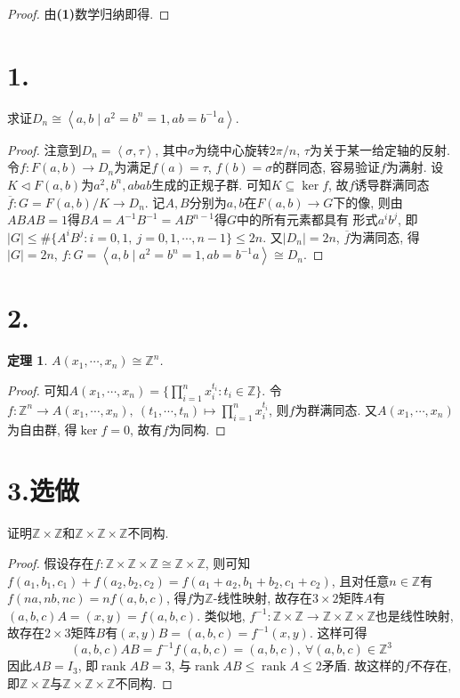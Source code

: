 \documentclass[12pt, a4paper, fontset=windows]{ctexart}
\newcommand{\Z}{\mathbb{Z}}
\newcommand{\abs}[1]{\left|{#1}\right|}
\newcommand{\cl}[1]{\overline{#1}} %
\newcommand{\gen}[1]{\left\langle{#1}\right\rangle}
\newcommand{\isom}{\cong} %
\newcommand{\rank}{\operatorname{rank}}
\newcommand{\xuan}{{\normalsize 选做}}
\newtheorem*{theorem}{定理}
\begin{document}
\begin{proof}
由{\bf (1)}数学归纳即得. 
\end{proof}

\section*{1.}

求证$D_n\isom\gen{a,b\mid a^2=b^n=1,ab=b^{-1}a}$. 

\begin{proof}
注意到$D_n=\gen{\sigma,\tau}$, 其中$\sigma$为绕中心旋转$2\pi/n$, 
$\tau$为关于某一给定轴的反射. 令$f:F(a,b)\to D_n$为满足$f(a)=\tau$, $f(b)=\sigma$的群同态, 
容易验证$f$为满射. 设$K\lhd F(a,b)$为$a^2,b^n,abab$生成的正规子群. 
可知$K\subseteq\ker f$, 故$f$诱导群满同态$\cl{f}:G=F(a,b)/K\to D_n$. 
记$A,B$分别为$a,b$在$F(a,b)\to G$下的像, 
则由$ABAB=1$得$BA=A^{-1}B^{-1}=AB^{n-1}$得$G$中的所有元素都具有
形式$a^ib^j$, 即$\abs{G}\le\#\{A^iB^j:i=0,1,\ j=0,1,\cdots,n-1\}\le 2n$. 
又$\abs{D_n}=2n$, $\cl{f}$为满同态, 得$\abs{G}=2n$, 
$f:G=\gen{a,b\mid a^2=b^n=1,ab=b^{-1}a}\isom D_n$. 
\end{proof}

\section*{2.}

\begin{theorem}
$A(x_1,\cdots,x_n)\isom\Z^n$. 
\end{theorem}

\begin{proof}
可知$A(x_1,\cdots,x_n)=\{\prod^n_{i=1}x_i^{t_i}:t_i\in\Z\}$. 
令$f:\Z^n\to A(x_1,\cdots,x_n),\ (t_1,\cdots,t_n)\mapsto\prod^n_{i=1}x_i^{t_i}$, 
则$f$为群满同态. 又$A(x_1,\cdots,x_n)$为自由群, 得$\ker f=0$, 故有$f$为同构. 
\end{proof}

\section*{3.\xuan}

证明$\Z\times\Z$和$\Z\times\Z\times\Z$不同构. 

\begin{proof}
假设存在$f:\Z\times\Z\times\Z\isom\Z\times\Z$, 
则可知$f(a_1,b_1,c_1)+f(a_2,b_2,c_2)=f(a_1+a_2,b_1+b_2,c_1+c_2)$, 
且对任意$n\in\Z$有$f(na,nb,nc)=nf(a,b,c)$, 得$f$为$\Z$-线性映射, 
故存在$3\times 2$矩阵$A$有$(a,b,c)A=(x,y)=f(a,b,c)$. 
类似地, $f^{-1}:\Z\times\Z\to\Z\times\Z\times\Z$也是线性映射, 
故存在$2\times 3$矩阵$B$有$(x,y)B=(a,b,c)=f^{-1}(x,y)$. 这样可得
\[(a,b,c)AB=f^{-1}f(a,b,c)=(a,b,c),\ \forall(a,b,c)\in\Z^3\]
因此$AB=I_3$, 即$\rank AB=3$, 与$\rank AB\le\rank A\le 2$矛盾. 
故这样的$f$不存在, 即$\Z\times\Z$与$\Z\times\Z\times\Z$不同构. 
\end{proof}
\end{document}
